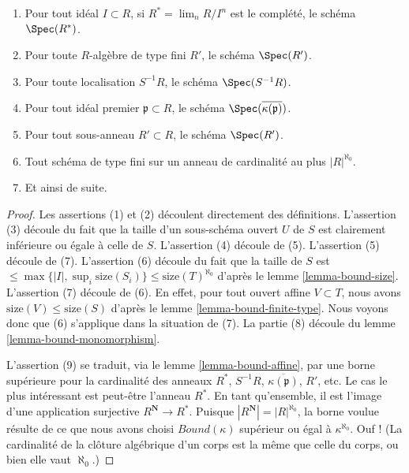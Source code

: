 \begin{lemma}
\begin{enumerate}
\begin{enumerate}
\item Pour tout idéal $I \subset R$, si $R^* = \lim_n R/I^n$ est le
complété, le schéma $\Spec(R^*)$.
\item Pour toute $R$-algèbre de type fini $R'$, le schéma $\Spec(R')$.
\item Pour toute localisation $S^{-1}R$, le schéma $\Spec(S^{-1}R)$.
\item Pour tout idéal premier $\mathfrak p \subset R$, le schéma
$\Spec(\overline{\kappa(\mathfrak p)})$.
\item Pour tout sous-anneau $R' \subset R$, le schéma $\Spec(R')$.
\item Tout schéma de type fini sur un anneau de cardinalité au plus
$|R|^{\aleph_0}$.
\item Et ainsi de suite.
\end{enumerate}
\end{enumerate}
\end{lemma}

\begin{proof}
Les assertions (1) et (2) découlent directement des définitions.
L'assertion (3) découle du fait que la taille d'un sous-schéma ouvert $U$ de
$S$ est clairement inférieure ou égale à celle de $S$.
L'assertion (4) découle de (5).
L'assertion (5) découle de (7).
L'assertion (6) découle du fait que la taille de $S$ est
$\leq \max\{|I|, \sup_i \text{size}(S_i)\} \leq \text{size}(T)^{\aleph_0}$
d'après le lemme \ref{lemma-bound-size}. L'assertion (7) découle de (6).
En effet, pour tout ouvert affine $V \subset T$, nous avons
$\text{size}(V) \leq \text{size}(S)$ d'après le
lemme \ref{lemma-bound-finite-type}.
Nous voyons donc que (6) s'applique dans la situation de (7).
La partie (8) découle du lemme \ref{lemma-bound-monomorphism}.

\medskip\noindent
L'assertion (9) se traduit, via le lemme \ref{lemma-bound-affine}, par une
borne supérieure pour la cardinalité des anneaux
$R^*$, $S^{-1}R$, $\overline{\kappa(\mathfrak p)}$, $R'$, etc.
Le cas le plus intéressant est peut-être l'anneau $R^*$. En tant qu'ensemble,
il est l'image d'une application surjective $R^{\mathbf{N}} \to R^*$.
Puisque $|R^{\mathbf{N}}| = |R|^{\aleph_0}$, la borne voulue résulte de ce que
nous avons choisi $Bound(\kappa)$ supérieur ou égal à $\kappa^{\aleph_0}$.
Ouf ! (La cardinalité de la clôture algébrique d'un corps
est la même que celle du corps, ou bien elle vaut $\aleph_0$.)
\end{proof}

